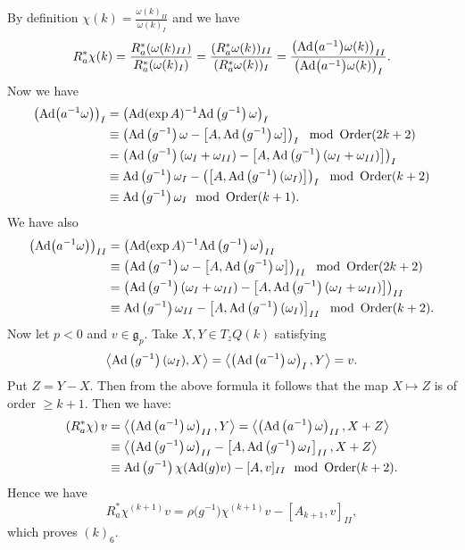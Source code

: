 \documentclass[10pt,a4paper]{amsart}
\newcommand{\g}{\mathfrak g}
\newcommand{\Ad}{\operatorname{Ad}}
\newcommand{\Order}{\operatorname{Order}}
\numberwithin{equation}{section}
\begin{document}
By definition
$\chi(k) = \frac {\omega(k)_{II}} { \omega(k)_I}$
and we have
\[
R_a^*\chi(k)
= \frac {R_a^* (\omega(k)_{II})}{R_a^*( \omega(k)_I) }
=\frac { (R_a^*\omega(k))_{II}} { (R_a^*\omega(k))_I}
=\frac { \big({\rm Ad}\big(a^{-1}\big)\omega(k)\big)_{II}} { \big({\rm Ad}\big(a^{-1}\big)\omega(k)\big)_I}.
\]
Now we have
\begin{align*}
\left({\rm Ad}\big(a^{-1}\omega\big)\right)_I
	&=\left(\Ad (\exp A)^{-1} {\rm Ad}\left(g^{-1}\right)\omega\right)_I \\
	&\equiv \left( {\rm Ad}\left(g^{-1}\right)\omega - \left[ A, {\rm Ad}\left(g^{-1}\right)\omega \right] \right)_I \mod \Order(2k+2)
\\
	&= \left( {\rm Ad}\left(g^{-1}\right) (\omega_I + \omega_{II} ) - \left[ A, {\rm Ad}\left(g^{-1}\right) (\omega_I + \omega_{II}) \right] \right)_I \\
	&\equiv {\rm Ad}\left(g^{-1}\right) \omega_I - \left( \left[ A, {\rm Ad}\left(g^{-1}\right) (\omega_I ) \right] \right)_I \mod \Order(k+2)
\\
	&\equiv {\rm Ad}\left(g^{-1}\right) \omega_I \mod \Order(k+1).
\end{align*}
We have also
\begin{align*}
	\left({\rm Ad}\big(a^{-1}\omega\big)\right)_{II}
	&=\left(\Ad (\exp A)^{-1} {\rm Ad}\left(g^{-1}\right)\omega\right)_{II} \\
	&\equiv \left( {\rm Ad}\left(g^{-1}\right)\omega - \left[ A, {\rm Ad}\left(g^{-1}\right)\omega \right] \right)_{II}
	\mod \Order(2k+2) \\
	&= \left( {\rm Ad}\left(g^{-1}\right) (\omega_I + \omega_{II} ) - \left[ A, {\rm Ad}\left(g^{-1}\right) (\omega_I + \omega_{II} ) \right] \right)_{I I} \\
	&\equiv {\rm Ad}\left(g^{-1}\right) \omega_{II} - \left[ A, {\rm Ad}\left(g^{-1}\right) (\omega_I ) \right]_{II} \mod \Order(k+2).
\end{align*}
Now let $ p < 0$ and $ v \in \g_p $. Take $ X, Y \in T_zQ(k)$ satisfying
\[
\left\langle {\rm Ad}\left(g^{-1}\right) (\omega_I) , X \right\rangle
= \left\langle \left({\rm Ad}\left(a^{-1}\right)\omega\right)_I , Y \right\rangle = v.
\]
Put $Z = Y-X$. Then from the above formula it follows that
the map $ X \mapsto Z$ is of order $\ge k+1$.
Then we have:
\begin{align*}
	\left(R_a^*\chi \right)v &= \left\langle \left({\rm Ad}\left(a^{-1}\right)\omega\right)_{II} , Y \right\rangle
= \left\langle \left({\rm Ad}\left(a^{-1}\right)\omega\right)_{II} , X+Z \right\rangle \\
	&\equiv \left\langle\left( {\rm Ad}\left(g^{-1}\right)\omega\right)_{II} - \left[ A, {\rm Ad}\left(g^{-1}\right) \omega_I \right]_{II} , X+ Z \right\rangle
\\
	&\equiv {\rm Ad}\left(g^{-1}\right) \chi ({\rm Ad}(g)v) - [ A, v] _{II} \mod \Order (k+2).
\end{align*}
Hence we have
\[
R_a^* \chi ^{(k+1)} v = \rho \big(g^{-1} \big) \chi ^{(k+1)}v - [A_{k+1} , v ] _{II},
\]
which proves $(k)_6$.
\end{document}
